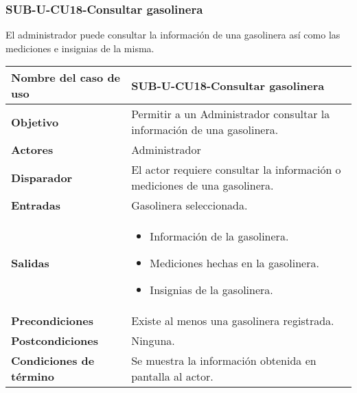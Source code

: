 \subsubsection{SUB-U-CU18-Consultar gasolinera}\label{SUB-U-CU18}
El administrador puede consultar la información de una gasolinera así como las mediciones e insignias de la misma.
\begin{longtable}{|J{5cm}|J{10.3cm}|}
	\hline
	\textbf{Nombre del caso de uso} &
		SUB-U-CU18-Consultar gasolinera \\ \hline
	\textbf{Objetivo} &
		Permitir a un Administrador consultar la información de una gasolinera. \\ \hline
	\textbf{Actores} &
		Administrador \\ \hline 
	\textbf{Disparador} & 
		El actor requiere consultar la información o mediciones de una gasolinera. \\ \hline 
	\textbf{Entradas} & Gasolinera seleccionada.
		\\ \hline 
	\textbf{Salidas} & 
		\begin{itemize}
			\item Información de la gasolinera.
			\item Mediciones hechas en la gasolinera.
			\item Insignias de la gasolinera.
		\end{itemize} 
		\\ \hline
	\textbf{Precondiciones} & Existe al menos una gasolinera registrada.
		\\ \hline
	\textbf{Postcondiciones} & Ninguna.
		\\ \hline
	\textbf{Condiciones de término} & Se muestra la información obtenida en pantalla al actor.
		\\ \hline 

\end{longtable}
